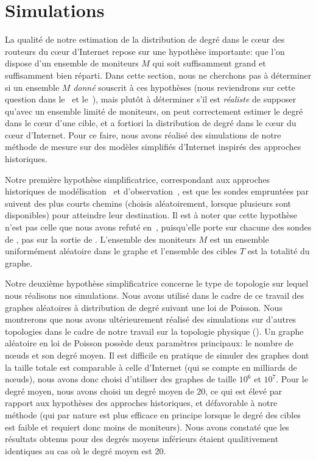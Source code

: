 \section{Simulations}
\label{sec:traceroute-simuls}

La qualité de notre estimation de la distribution de degré dans le cœur des
routeurs du cœur d'Internet repose sur une hypothèse importante: que l'on
dispose d'un ensemble de moniteurs $M$ qui soit suffisamment grand et
suffisamment bien réparti. Dans cette section, nous ne cherchons pas à
déterminer si un ensemble $M$ {\em donné} souscrit à ces hypothèses (nous
reviendrons sur cette question dans le~ et
le~), mais plutôt à déterminer s'il est {\em réaliste} de
supposer qu'avec un ensemble limité de moniteurs, on peut correctement estimer
le degré dans le cœur d'une cible, et a fortiori la distribution de degré dans
le cœur du cœur d'Internet. Pour ce faire, nous avons réalisé des simulations de
notre méthode de mesure sur des modèles simplifiés d'Internet inspirés des
approches historiques.

Notre première hypothèse simplificatrice, correspondant aux approches
historiques de modélisation~\cite{LakhinaBCX03,GuillaumeLM06} et
d'observation~\cite{GuillaumeLM06}, est que les sondes empruntées par
\traceroute suivent des plus courts chemins (choisis aléatoirement, lorsque
plusieurs sont disponibles) pour atteindre leur destination. Il est à noter que
cette hypothèse n'est pas celle que nous avons refuté
en~, puisqu'elle porte sur chacune des sondes de
\traceroute, pas sur la sortie de \traceroute. L'ensemble des moniteurs $M$ est
un ensemble uniformément aléatoire dans le graphe et l'ensemble des cibles $T$
est la totalité du graphe.

Notre deuxième hypothèse simplificatrice concerne le type de topologie sur
lequel nous réalisons nos simulations. Nous avons utilisé dans le cadre de ce
travail des graphes aléatoires à distribution de degré suivant une loi de
Poisson. Nous montrerons que nous avons ultérieurement réalisé des simulations
sur d'autres topologies dans le cadre de notre travail sur la topologie physique
(). Un graphe aléatoire en loi de Poisson possède deux
paramètres principaux: le nombre de n\oe{}uds et son degré moyen. Il est
difficile en pratique de simuler des graphes dont la taille totale est comparable à celle
d'Internet (qui se compte en milliards de n\oe{}uds), nous avons donc choisi
d'utiliser des graphes de taille $10^6$ et $10^7$. Pour le degré moyen, nous
avons choisi un degré moyen de 20, ce qui est élevé par rapport aux
hypothèses des approches historiques, et \apriori défavorable à notre méthode
(qui par nature est plus efficace en principe lorsque le degré des cibles est
faible et requiert donc moins de moniteurs). Nous avons constaté que les
résultats obtenus pour des degrés moyens inférieurs étaient qualitivement
identiques au cas où le degré moyen est 20.

